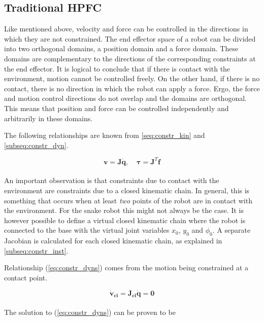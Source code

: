 \subsection{Traditional HPFC} \label{subseq:HPFC}

Like mentioned above, velocity and force can be controlled in the directions in which they are not constrained. The end effector space of a robot can be divided into two orthogonal domains, a position domain and a force domain. These domains are complementary to the directions of the corresponding constraints at the end effector. It is logical to conclude that if there is contact with the environment, motion cannot be controlled freely. On the other hand, if there is no contact, there is no direction in which the robot can apply a force. Ergo, the force and motion control directions do not overlap and the domains are orthogonal. This means that position and force can be controlled independently and arbitrarily in these domains.

The following relationships are known from \ref{seq:constr_kin} and \ref{subseq:constr_dyn}. 

\begin{equation}
	\mathbf{v = J \dot{q}} \textrm{,} \quad  \  \boldsymbol{\tau} \mathbf{= J}^T \mathbf{f}
\end{equation}
\\
An important observation is that constraints due to contact with the environment are constraints due to a closed kinematic chain. In general, this is something that occurs when at least \textit{two} points of the robot are in contact with the environment. For the snake robot this might not always be the case. It is however possible to define a virtual closed kinematic chain where the robot is connected to the base with the virtual joint variables $x_0$, $y_0$ and $\phi_0$.
A separate Jacobian is calculated for each closed kinematic chain, as explained in \ref{subseq:constr_inst}.

Relationship (\ref{eq:constr_dyns}) comes from the motion being constrained at a contact point.

\begin{equation} \label{eq:constr_dyns}
    \mathbf{\dot{v}_{ci} = J_{ci} \dot{q} = 0}
\end{equation}
\\
The solution to (\ref{eq:constr_dyns}) can be proven to be

